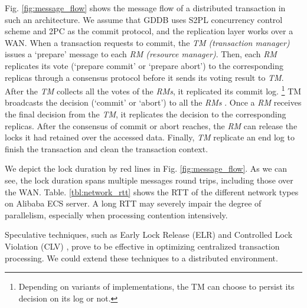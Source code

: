 \documentclass[conference]{IEEEtran}
\begin{document}
Fig.    \ref{fig:message_flow} shows the message flow of a distributed transaction in such an architecture. We assume that
GDDB uses S2PL concurrency control scheme and 2PC as the commit protocol, and the replication layer works over a WAN.
When a transaction requests to commit, the \emph{TM (transaction manager)} issues a `prepare' message to each \emph{RM (resource manager)}.
Then, each \emph{RM} replicates its vote (`prepare commit' or `prepare abort') to the corresponding replicas through a consensus protocol before it
sends its voting result to \emph{TM}.
After the \emph{TM} collects all the votes of the \emph{RMs}, it replicated its commit log.
\footnote{Depending on variants of implementations, the TM can choose to persist its decision on its log or not.}
TM broadcasts the decision (`commit' or `abort') to all the \emph{RMs}
.
Once a \emph{RM} receives the final decision from the \emph{TM}, it replicates the decision to the corresponding replicas.
After the consensus of commit or abort reaches, the \emph{RM}
can release the locks it had retained over the accessed data.
Finally, \emph{TM} replicate an end log to finish the transaction and clean the transaction context.

We depict the lock duration by red lines in Fig.    \ref{fig:message_flow}.
As we can see, the lock duration spans multiple messages round trips, including those over the WAN.
Table.    \ref{tbl:network_rtt} shows the RTT of the different network types on Alibaba ECS server.
A long RTT may severely impair the degree of parallelism, especially when processing contention intensively.

Speculative techniques, such as Early Lock Release (ELR) \cite{EfficientLocking:conf/vldb/KimuraGK12} and Controlled Lock Violation (CLV)
\cite{CLV:conf/sigmod/GraefeLKTV13}, prove to be effective in optimizing centralized transaction processing.
We could extend these techniques to a distributed environment.


\begin{table}[tbp]
  \centering
  \caption{network message RTT on Alibaba ECS}

\label{tbl:network_rtt}
\end{table}
\end{document}
